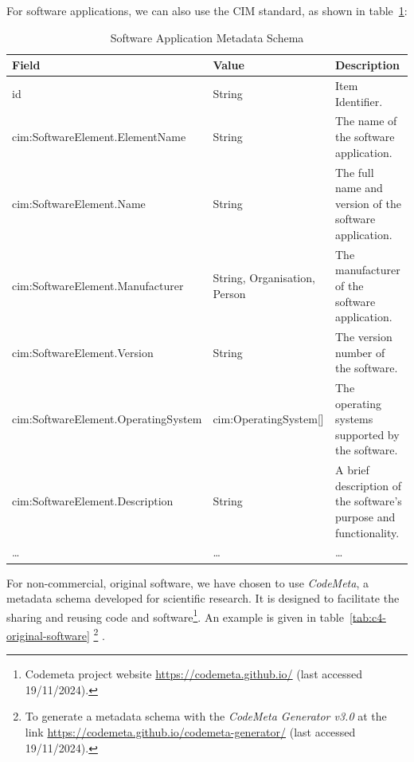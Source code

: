 For software applications, we can also use the CIM standard, as shown in table~\ref{tab:c4-software}:

\begin{longtable}{|p{}|p{}|p{}|}
    \caption{Software Application Metadata Schema} \label{tab:c4-software} \\
    \hline
    \textbf{Field} & \textbf{Value} & \textbf{Description} \\
    \hline

    \scriptsize id                                    & \scriptsize String                         & \scriptsize Item Identifier. \\
    \hline
    \scriptsize cim:SoftwareElement.ElementName       & \scriptsize String                         & \scriptsize The name of the software application. \\
    \hline
    \scriptsize cim:SoftwareElement.Name              & \scriptsize String                         & \scriptsize The full name and version of the software application. \\
    \hline
    \scriptsize cim:SoftwareElement.Manufacturer      & \scriptsize String, \textcolor{uniudColor3}{Organisation}, \textcolor{uniudColor3}{Person}     & \scriptsize The manufacturer of the software application. \\
    \hline
    \scriptsize cim:SoftwareElement.Version           & \scriptsize String                         & \scriptsize The version number of the software. \\
    \hline
    \scriptsize cim:SoftwareElement.OperatingSystem   & \scriptsize \textcolor{uniudColor3}{cim:OperatingSystem}[]          & \scriptsize The operating systems supported by the software. \\
    \hline
    \scriptsize cim:SoftwareElement.Description       & \scriptsize String                         & \scriptsize A brief description of the software’s purpose and functionality. \\
    \hline
    …                                     & \scriptsize …                              & … \\
    \hline

\end{longtable}

For non-commercial, original software, we have chosen to use \textit{CodeMeta}, a metadata schema developed for scientific research. It is designed to facilitate the sharing and reusing code and software\footnote{Codemeta project website \url{https://codemeta.github.io/} (last accessed 19/11/2024).}. An example is given in table~\ref{tab:c4-original-software} \footnote{To generate a metadata schema with the \textit{CodeMeta Generator v3.0} at the link \url{https://codemeta.github.io/codemeta-generator/} (last accessed 19/11/2024).}
.

